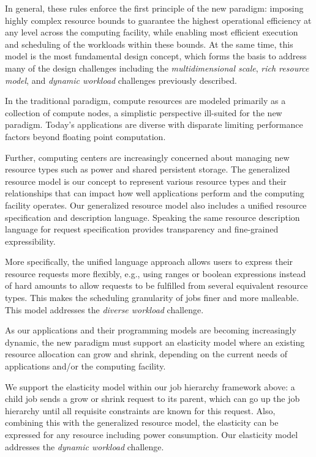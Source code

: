In general, these rules enforce the first principle 
of the new paradigm: imposing highly complex resource bounds 
to guarantee the highest operational efficiency 
at any level across the computing facility, while enabling 
most efficient execution and scheduling of the workloads 
within these bounds. 
At the same time, this model is the most fundamental 
design concept, which forms the basis to address 
many of the design challenges including 
the {\em multidimensional scale}, {\em rich resource model},
and {\em dynamic workload} challenges previously described.

\vspace{1ex}
 In the traditional 
paradigm, compute resources are modeled primarily 
as a collection of compute nodes, a simplistic perspective 
ill-suited for the new paradigm. Today's applications 
are diverse with disparate limiting performance factors 
beyond floating point computation. 

Further, computing centers are increasingly concerned 
about managing new resource types such as power 
and shared persistent storage. The generalized resource 
model is our concept to represent various resource types 
and their relationships that can impact how well applications 
perform and the computing facility operates. 
Our generalized resource model also includes a unified 
resource specification and description language. 
Speaking the same resource description language 
for request specification provides transparency and 
fine-grained expressibility. 

More specifically, the unified language approach 
allows users to express their resource requests 
more flexibly, e.g., using ranges or boolean 
expressions instead of hard amounts to allow requests 
to be fulfilled from several equivalent resource types. 
This makes the scheduling granularity 
of jobs finer and more malleable.
This model addresses the {\em diverse workload} challenge.

\vspace{1ex}
 As our 
applications and their programming models are becoming 
increasingly dynamic, the new paradigm must support 
an elasticity model where an existing resource allocation 
can grow and shrink, depending on the current needs 
of applications and/or the computing facility. 

We support the elasticity model within our job hierarchy 
framework above: a child job sends a grow or shrink request 
to its parent, which can go up the job hierarchy 
until all requisite constraints are known for this request. 
Also, combining this with the generalized resource model, 
the elasticity can be expressed for any resource including 
power consumption. Our elasticity model addresses 
the {\em dynamic workload} challenge.

